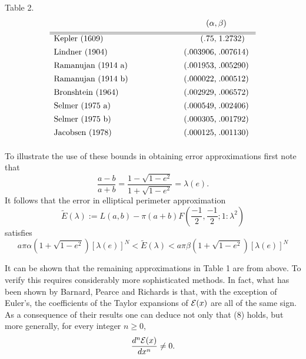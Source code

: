 \documentclass[12pt]{article}
\begin{document}
\vspace {12pt} 
\noindent Table 2.
$$
\begin{array}{lc}
& \hspace{.75in} (\alpha,\beta) \\ [1ex]
\hline \hline
\mbox{Kepler (1609)} & \hspace{.96in} \mbox{ (.75,\;1.2732) } \\[1ex]
\mbox{Lindner (1904)} & \hspace{.75in}\mbox{ (.003906,\;.007614) } \\[1ex]
\mbox{Ramanujan (1914 a)} & \hspace{.75in}\mbox{ (.001953,\;.005290) } 
\\[1ex]
\mbox{Ramanujan (1914 b)} & \hspace{.75in}\mbox{ (.000022,\;.000512) } 
\\[1ex]
\mbox{Bronshtein (1964)} & \hspace{.75in}\mbox{ (.002929,\;.006572) 
}\\[1ex]
\mbox{Selmer (1975 a)} & \hspace{.75in}\mbox{ (.000549,\;.002406) } 
\\[1ex]
\mbox{Selmer (1975 b)} &\hspace{.75in} \mbox{ (.000305,\;.001792) } 
\\[1ex]
\mbox{Jacobsen (1978)} & \hspace{.75in}\mbox{ (.000125,\;.001130) }\\[1ex]
\end{array}
$$

 


To illustrate the use of these bounds in obtaining error approximations 
first note that 
$$
\frac{a-b}{a+b}=\frac{1-\sqrt{1-e^2}}{1+\sqrt{1-e^2}}=\lambda(e).
$$
It follows that the error in elliptical perimeter approximation 
$$
\tilde{E}(\lambda):= L(a,b) - \pi (a+b) F(\frac{-1}{2}, \frac{-1}{2}; 1:\lambda^2)
$$
satisfies
\begin{equation} 
a \pi \alpha   (1 + \sqrt{1-e^2}) [\lambda(e)]^N < \tilde{E}(\lambda)<a \pi \beta 
  (1 + \sqrt{1-e^2})
[\lambda(e)]^N
\end{equation} 



                            

\vspace{18pt} 
\vspace{12pt} 


It can be shown that the remaining approximations
in Table 1 are from above.   To verify this requires considerably more 
sophisticated methods. In fact,
what has been shown by  Barnard, Pearce and Richards \cite{KD} is that, 
with the exception of
Euler's,  the  coefficients of the Taylor expansions of
${\cal E}(x)$ are all of the same sign.  As a consequence of their 
results one can deduce not only that
(8) holds, but more generally,  for every integer $n \geq 0$, 
$$
\frac{d^n{\cal E}(x)}{dx^n} \neq0.
$$ 
\end{document}
